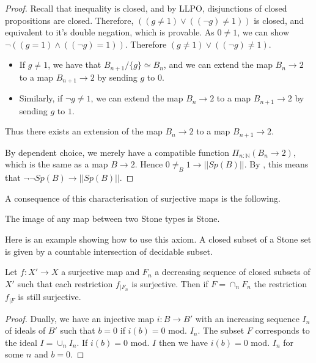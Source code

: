 \begin{proof}
  Recall that inequality is closed, and by LLPO, disjunctions of closed propositions are closed. 
  Therefore, $( (g\neq 1) \vee ((\neg g) \neq 1))$ is closed, and equivalent to it's double negation, 
  which is provable. As $0\neq 1$, we can show $\neg ( (g = 1) \wedge ( (\neg g) = 1))$. 
  Therefore $ (g\neq 1) \vee ((\neg g) \neq 1)$. 
  \begin{itemize}
    \item 
  If $g \neq 1$, we have that $B_{n+1} / \{g\} \simeq B_n$, and we can extend the map $B_n \to 2$ 
  to a map $B_{n+1} \to 2$ by sending $g$ to $0$. 
    \item 
  Similarly, if $\neg g \neq 1$, we can extend the map $B_n \to 2$ to a map $B_{n+1} \to 2$ by sending $g $ to $1$. 
  \end{itemize}
  Thus there exists an extension of the map $B_n \to 2$ to a map $B_{n+1} \to 2$. 
  
  By dependent choice, we merely have a compatible function $\Pi_{n:\mathbb N} (B_n \to 2)$, 
  which is the same as a map $B\to 2$. 
  Hence $0\neq_B1 \to ||Sp(B)||$. 
  By , this means that $\neg \neg Sp(B) \to ||Sp(B)||$. 
\end{proof}

A consequence of this characterisation of surjective maps is the following.

\begin{proposition}
  The image of any map between two Stone types is Stone.
\end{proposition}

Here is an example showing how to use this axiom. A closed subset of a Stone set is given by a countable
intersection of decidable subset.

\begin{proposition}
  Let $f:X'\rightarrow X$ a surjective map and $F_n$ a decreasing sequence of closed subsets of $X'$ such that
  each restriction $f_{|F_n}$ is surjective. Then if $F = \cap_n F_n$ the restriction $f_{|F}$ is still surjective.
\end{proposition}

\begin{proof}
  Dually, we have an injective map $i:B\rightarrow B'$ with an increasing sequence $I_n$ of ideals of $B'$ such that
  $b = 0$ if $i(b) = 0$ mod. $I_n$. The subset $F$ corresponds to the ideal $I = \cup_n I_n$. If $i(b) = 0$ mod. $I$
  then we have $i(b) = 0$ mod. $I_n$ for some $n$ and $b = 0$. 
\end{proof}



